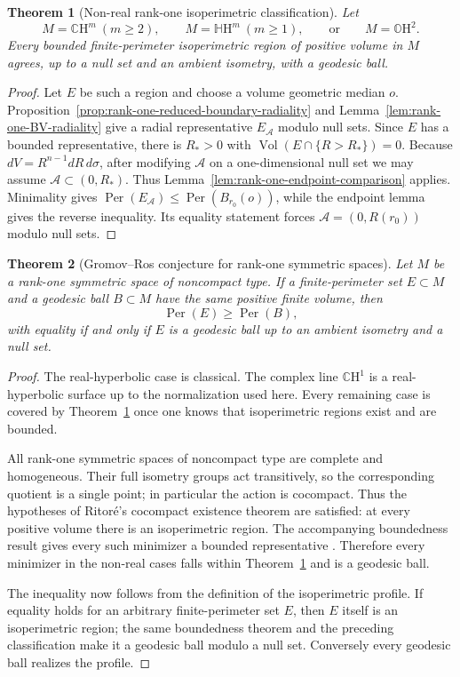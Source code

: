 \documentclass[11pt,reqno]{amsart}
\numberwithin{equation}{section}
\newtheorem{theorem}{Theorem}[section]
\theoremstyle{definition}
\theoremstyle{remark}
\newcommand{\CH}{\mathbb{C}\mathrm{H}}
\newcommand{\HH}{\mathbb{H}\mathrm{H}}
\newcommand{\OH}{\mathbb{O}\mathrm{H}}
\newcommand{\Vol}{\operatorname{Vol}}
\newcommand{\Per}{\operatorname{Per}}
\begin{document}
\begin{theorem}[Non-real rank-one isoperimetric classification]
\label{thm:nonreal-rank-one-rigidity}
Let
\[
 M=\CH^m\ (m\ge2),\qquad M=\HH^m\ (m\ge1),
 \qquad\text{or}\qquad M=\OH^2.
\]
Every bounded finite-perimeter isoperimetric region of positive volume in
$M$ agrees, up to a null set and an ambient isometry, with a geodesic ball.
\end{theorem}

\begin{proof}
Let $E$ be such a region and choose a volume geometric median $o$.
Proposition~\ref{prop:rank-one-reduced-boundary-radiality} and
Lemma~\ref{lem:rank-one-BV-radiality} give a radial representative
$E_{\mathscr A}$ modulo null sets.  Since $E$ has a bounded representative,
there is $R_*>0$ with $\Vol(E\cap\{R>R_*\})=0$.  Because
$dV=R^{n-1}dR\,d\sigma$, after modifying $\mathscr A$ on a
one-dimensional null set we may assume $\mathscr A\subset(0,R_*)$.
Thus Lemma~\ref{lem:rank-one-endpoint-comparison} applies.  Minimality gives
$\Per(E_{\mathscr A})\le\Per(B_{r_0}(o))$, while the endpoint lemma gives the
reverse inequality.  Its equality statement forces
$\mathscr A=(0,R(r_0))$ modulo null sets.
\end{proof}

\begin{theorem}[Gromov--Ros conjecture for rank-one symmetric spaces]
\label{thm:rank-one-gromov-ros}
Let $M$ be a rank-one symmetric space of noncompact type.  If a
finite-perimeter set $E\subset M$ and a geodesic ball $B\subset M$ have the
same positive finite volume, then
\[
 \Per(E)\ge\Per(B),
\]
with equality if and only if $E$ is a geodesic ball up to an ambient isometry
and a null set.
\end{theorem}

\begin{proof}
The real-hyperbolic case is classical.  The complex line $\CH^1$ is a
real-hyperbolic surface up to the normalization used here.  Every remaining
case is covered by Theorem~\ref{thm:nonreal-rank-one-rigidity} once one knows
that isoperimetric regions exist and are bounded.

All rank-one symmetric spaces of noncompact type are complete and homogeneous.
Their full isometry groups act transitively, so the corresponding quotient is a
single point; in particular the action is cocompact.  Thus the hypotheses of
Ritor\'e's cocompact existence theorem are satisfied: at every positive volume
there is an isoperimetric region.  The accompanying boundedness result gives
every such minimizer a bounded representative
\cite[Section~4.4, Theorem~4.25 and Lemmas~4.26--4.27]{Ritore2023}.  Therefore
every minimizer in the non-real cases falls within
Theorem~\ref{thm:nonreal-rank-one-rigidity} and is a geodesic ball.

The inequality now follows from the definition of the isoperimetric profile.
If equality holds for an arbitrary finite-perimeter set $E$, then $E$ itself
is an isoperimetric region; the same boundedness theorem and the preceding
classification make it a geodesic ball modulo a null set.  Conversely every
geodesic ball realizes the profile.
\end{proof}
\end{document}
